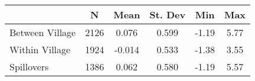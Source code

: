 \begin{tabular}{l*{5}{c}}\hline&\multicolumn{1}{c}{N}&\multicolumn{1}{c}{Mean}&\multicolumn{1}{c}{St. Dev}&\multicolumn{1}{c}{Min}&\multicolumn{1}{c}{Max}\\ \hline 
Between Village & 2126 & 0.076 & 0.599 & -1.19 & 5.77 \\
Within Village & 1924 & -0.014 & 0.533 & -1.38 & 3.55 \\
Spillovers & 1386 & 0.062 & 0.580 & -1.19 & 5.57 \\
\hline \end{tabular}
